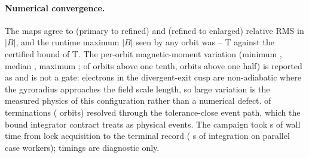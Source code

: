 \paragraph{Numerical convergence.}
 The maps agree to \WlfPrimaryToRefinedRms{} (primary to
refined) and \WlfRefinedToEnlargedRms{} (refined to enlarged) relative RMS in $|B|$,
and the runtime maximum $|B|$ seen by any orbit was
\WlfRuntimeBMin--\WlfRuntimeBMax{} T against the certified bound of
\WlfPrimaryCertifiedB{} T. The per-orbit magnetic-moment variation (minimum
\WlfMuMin, median \WlfMuMedian, maximum \WlfMuMax; \WlfMuAboveTenthP{} of orbits above
one tenth, \WlfMuAboveHalf{} orbits above one half) is reported as
\texttt{\WlfMuRole} and is not a gate: electrons in the divergent-exit cusp are
non-adiabatic where the gyroradius approaches the field scale length, so large
variation is the measured physics of this configuration rather than a numerical
defect. \WlfToleranceCloseShare{} of terminations (\WlfToleranceCloseCount{} orbits)
resolved through the tolerance-close event path, which the bound integrator contract
treats as physical events. The campaign took \WlfLifecycleWallS{} s of wall time from
lock acquisition to the terminal record (\WlfIntegrationWallS{} s of integration on
\WlfWorkers{} parallel case workers); timings are diagnostic only.

